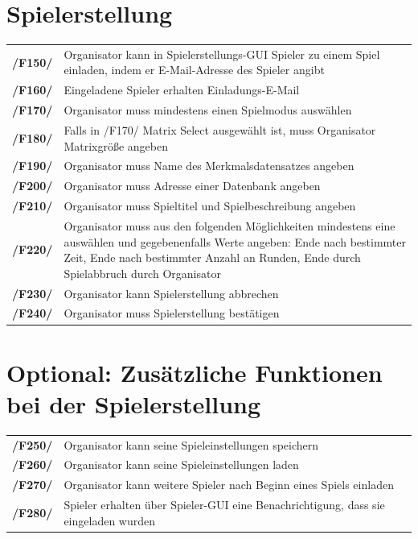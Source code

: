 \documentclass[a4paper]{scrreprt}
\begin{document}
    \section{Spielerstellung}
    \begin{tabularx}{\linewidth}{@{}>{\bfseries}l@{\hspace{.5em}}X@{}}
    /F150/ & \Gls{Organisator} kann in Spielerstellungs-GUI \Gls{Spieler} zu einem \Gls{Spiel} einladen, indem er E-Mail-Adresse des \Gls{Spieler} angibt \\
    /F160/ & Eingeladene \Gls{Spieler} erhalten Einladungs-E-Mail \\
    /F170/ & \Gls{Organisator} muss mindestens einen \Gls{Spielmodus} auswählen \\
    /F180/ & Falls in /F170/ \Gls{Matrix Select} ausgewählt ist, muss \Gls{Organisator} Matrixgröße angeben \\
    /F190/ & \Gls{Organisator} muss Name des Merkmalsdatensatzes angeben \\
    /F200/ & \Gls{Organisator} muss Adresse einer Datenbank angeben \\ %
    /F210/ & \Gls{Organisator} muss Spieltitel und Spielbeschreibung angeben \\ %
    /F220/ & \Gls{Organisator} muss aus den folgenden Möglichkeiten mindestens eine auswählen und gegebenenfalls Werte angeben: Ende nach bestimmter Zeit, Ende nach bestimmter Anzahl an Runden, Ende durch Spielabbruch durch Organisator \\
    /F230/ & \Gls{Organisator} kann Spielerstellung abbrechen \\
    /F240/ & \Gls{Organisator} muss Spielerstellung bestätigen \\
    \end{tabularx}
    
    \section{Optional: Zusätzliche Funktionen bei der Spielerstellung}
    \begin{tabularx}{\linewidth}{@{}>{\bfseries}l@{\hspace{.5em}}X@{}}
    /F250/ & \Gls{Organisator} kann seine \Gls{Spieleinstellungen} speichern \\
    /F260/ & \Gls{Organisator} kann seine \Gls{Spieleinstellungen} laden \\
    /F270/ & \Gls{Organisator} kann weitere \Gls{Spieler} nach Beginn eines \Gls{Spiel}s einladen \\
    /F280/ & \Gls{Spieler} erhalten über Spieler-GUI eine Benachrichtigung, dass sie eingeladen wurden \\ %
	\end{tabularx}
    
\end{document}
